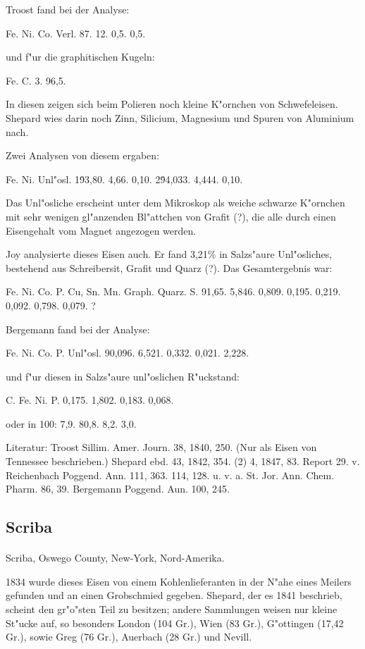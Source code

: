 \documentclass[a4paper, 11pt, oneside]{article}
\begin{document}
Troost fand bei der Analyse:

Fe. Ni. Co. Verl.  
87. 12. 0,5. 0,5.

und f"ur die graphitischen Kugeln:

Fe. C.  
3. 96,5.

In diesen zeigen sich beim Polieren noch kleine K"ornchen von Schwefeleisen. Shepard wies darin noch Zinn, Silicium, Magnesium und Spuren von Aluminium nach.

Zwei Analysen von diesem ergaben:

Fe. Ni. Unl"osl.  
1\. 93,80. 4,66. 0,10.  
2\. 94,033. 4,444. 0,10.

Das Unl"osliche erscheint unter dem Mikroskop als weiche schwarze K"ornchen mit sehr wenigen gl"anzenden Bl"attchen von Grafit (?), die alle durch einen Eisengehalt vom Magnet angezogen werden.

Joy analysierte dieses Eisen auch. Er fand 3,21\% in Salzs"aure Unl"osliches, bestehend aus Schreibersit, Grafit und Quarz (?). Das Gesamtergebnis war:

Fe. Ni. Co. P. Cu, Sn. Mn. Graph. Quarz. S.  
91,65. 5,846. 0,809. 0,195. 0,219. 0,092. 0,798. 0,079. ?

Bergemann fand bei der Analyse:

Fe. Ni. Co. P. Unl"osl.  
90,096. 6,521. 0,332. 0,021. 2,228.

und f"ur diesen in Salzs"aure unl"oslichen R"uckstand:

C. Fe. Ni. P.  
0,175. 1,802. 0,183. 0,068.

oder in 100: 7,9. 80,8. 8,2. 3,0.

Literatur: Troost Sillim. Amer. Journ. 38, 1840, 250. (Nur als Eisen von Tennessee beschrieben.) Shepard ebd. 43, 1842, 354. (2) 4, 1847, 83. Report 29. v. Reichenbach Poggend. Ann. 111, 363. 114, 128. u. v. a. St. Jor. Ann. Chem. Pharm. 86, 39. Bergemann Poggend. Aun. 100, 245.

\subsection{Scriba}
\normalsize
\paragraph{}
Scriba, Oswego County, New-York, Nord-Amerika.

1834 wurde dieses Eisen von einem Kohlenlieferanten in der N"ahe eines Meilers gefunden und an einen Grobschmied gegeben. Shepard, der es 1841 beschrieb, scheint den gr"o"sten Teil zu besitzen; andere Sammlungen weisen nur kleine St"ucke auf, so besonders London (104 Gr.), Wien (83 Gr.), G"ottingen (17,42 Gr.), sowie Greg (76 Gr.), Auerbach (28 Gr.) und Nevill.
\end{document}
